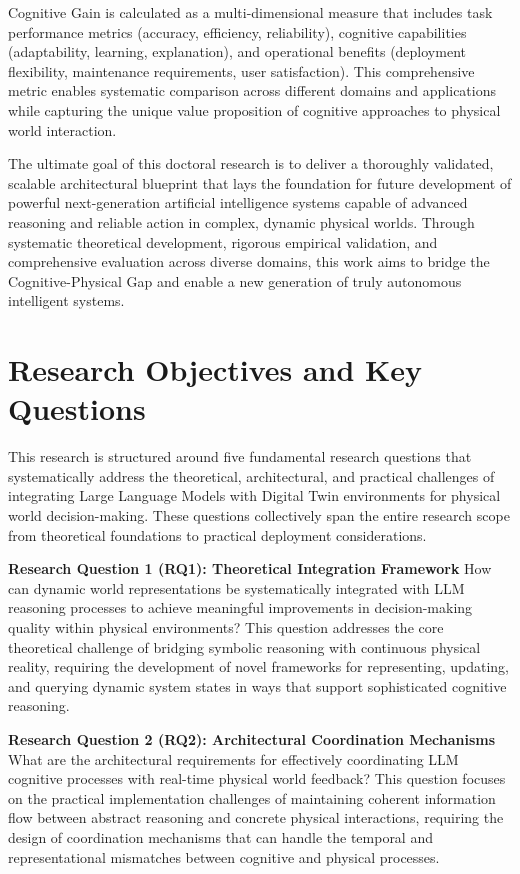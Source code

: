 Cognitive Gain is calculated as a multi-dimensional measure that includes task performance metrics (accuracy, efficiency, reliability), cognitive capabilities (adaptability, learning, explanation), and operational benefits (deployment flexibility, maintenance requirements, user satisfaction). This comprehensive metric enables systematic comparison across different domains and applications while capturing the unique value proposition of cognitive approaches to physical world interaction.

The ultimate goal of this doctoral research is to deliver a thoroughly validated, scalable architectural blueprint that lays the foundation for future development of powerful next-generation artificial intelligence systems capable of advanced reasoning and reliable action in complex, dynamic physical worlds. Through systematic theoretical development, rigorous empirical validation, and comprehensive evaluation across diverse domains, this work aims to bridge the Cognitive-Physical Gap and enable a new generation of truly autonomous intelligent systems.

\section{Research Objectives and Key Questions}

This research is structured around five fundamental research questions that systematically address the theoretical, architectural, and practical challenges of integrating Large Language Models with Digital Twin environments for physical world decision-making. These questions collectively span the entire research scope from theoretical foundations to practical deployment considerations.

\textbf{Research Question 1 (RQ1): Theoretical Integration Framework}
How can dynamic world representations be systematically integrated with LLM reasoning processes to achieve meaningful improvements in decision-making quality within physical environments? This question addresses the core theoretical challenge of bridging symbolic reasoning with continuous physical reality, requiring the development of novel frameworks for representing, updating, and querying dynamic system states in ways that support sophisticated cognitive reasoning.

\textbf{Research Question 2 (RQ2): Architectural Coordination Mechanisms}
What are the architectural requirements for effectively coordinating LLM cognitive processes with real-time physical world feedback? This question focuses on the practical implementation challenges of maintaining coherent information flow between abstract reasoning and concrete physical interactions, requiring the design of coordination mechanisms that can handle the temporal and representational mismatches between cognitive and physical processes.

